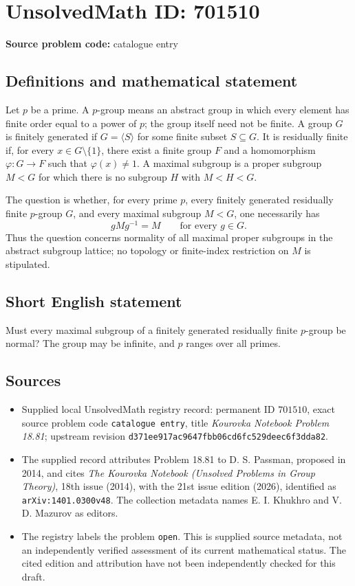 \documentclass[11pt]{article}
\begin{document}
\section*{UnsolvedMath ID: 701510}
\textbf{Source problem code:} catalogue entry
\subsection{Definitions and mathematical statement}
Let \(p\) be a prime. A \(p\)-group means an abstract group in which every element has finite order equal to a power of \(p\); the group itself need not be finite. A group \(G\) is finitely generated if \(G=\langle S\rangle\) for some finite subset \(S\subseteq G\). It is residually finite if, for every \(x\in G\setminus\{1\}\), there exist a finite group \(F\) and a homomorphism \(\varphi:G\to F\) such that \(\varphi(x)\ne 1\). A maximal subgroup is a proper subgroup \(M<G\) for which there is no subgroup \(H\) with \(M<H<G\).

The question is whether, for every prime \(p\), every finitely generated residually finite \(p\)-group \(G\), and every maximal subgroup \(M<G\), one necessarily has
\[
 gMg^{-1}=M\qquad\text{for every }g\in G.
\]
Thus the question concerns normality of all maximal proper subgroups in the abstract subgroup lattice; no topology or finite-index restriction on \(M\) is stipulated.
\subsection{Short English statement}
Must every maximal subgroup of a finitely generated residually finite \(p\)-group be normal? The group may be infinite, and \(p\) ranges over all primes.
\subsection{Sources}
\begin{itemize}
\item Supplied local UnsolvedMath registry record: permanent ID \(701510\), exact source problem code \texttt{catalogue entry}, title \emph{Kourovka Notebook Problem 18.81}; upstream revision \texttt{d371ee917ac9647fbb06cd6fc529deec6f3dda82}.
\item The supplied record attributes Problem 18.81 to D. S. Passman, proposed in 2014, and cites \emph{The Kourovka Notebook (Unsolved Problems in Group Theory)}, 18th issue (2014), with the 21st issue edition (2026), identified as \texttt{arXiv:1401.0300v48}. The collection metadata names E. I. Khukhro and V. D. Mazurov as editors.
\item The registry labels the problem \texttt{open}. This is supplied source metadata, not an independently verified assessment of its current mathematical status. The cited edition and attribution have not been independently checked for this draft.
\end{itemize}
\end{document}
